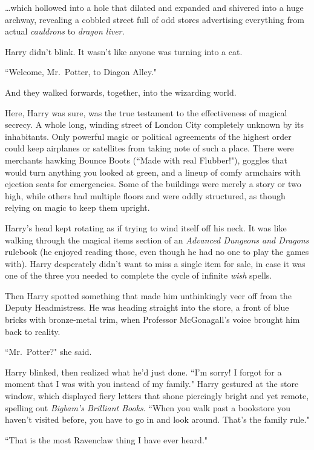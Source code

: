 {\ldots}which hollowed into a hole that dilated and expanded and shivered into a huge archway, revealing a cobbled street full of odd stores advertising everything from actual \emph{cauldrons} to \emph{dragon liver.}

Harry didn't blink. It wasn't like anyone was turning into a cat.

``Welcome, Mr.~Potter, to Diagon Alley."

And they walked forwards, together, into the wizarding world.

Here, Harry was sure, was the true testament to the effectiveness of magical secrecy. A whole long, winding street of London City completely unknown by its inhabitants. Only powerful magic or political agreements of the highest order could keep airplanes or satellites from taking note of such a place. There were merchants hawking
Bounce Boots (``Made with real Flubber!"), goggles that would turn anything you looked at green, and a lineup of comfy armchairs with ejection seats for emergencies. Some of the buildings were merely a story or two high, while others had multiple floors and were oddly structured, as though relying on magic to keep them upright.

Harry's head kept rotating as if trying to wind itself off his neck. It was like walking through the magical items section of an \emph{Advanced Dungeons and Dragons} rulebook (he enjoyed reading those, even though he had no one to play the games with). Harry desperately didn't want to miss a single item for sale, in case it was one of the three you needed to complete the cycle of infinite \emph{wish} spells.

Then Harry spotted something that made him unthinkingly veer off from the Deputy Headmistress. He was heading straight into the store, a front of blue bricks with bronze-metal trim, when Professor McGonagall's voice brought him back to reality.

``Mr.~Potter?" she said.

Harry blinked, then realized what he'd just done. ``I'm sorry! I forgot for a moment that I was with you instead of my family." Harry gestured at the store window, which displayed fiery letters that shone piercingly bright and yet remote, spelling out \emph{Bigbam's Brilliant Books}. ``When you walk past a bookstore you haven't visited before, you have to go in and look around. That's the family rule."

``That is the most Ravenclaw thing I have ever heard."

